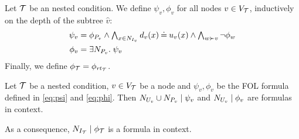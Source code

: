 Let ${\mathcal{T}}$ be an {\proper} nested condition. We define $\psi_v,\phi_v$ for all nodes $v\in V_{\mathcal{T}}$, inductively on the depth of the subtree $\hat v$:
%
\begin{align}
\psi_v = {} & \textstyle \phi_{P_v}\wedge \bigwedge_{x\in N_{I_v}} d_v(x)\Eq u_v(x) \wedge \bigwedge_{w\childof v} \neg\phi_w \label{eq:psi} \\
\phi_v = {} & \exists N_{P_v}\st \psi_v\label{eq:phi} 
\end{align}
%
Finally, we define $\phi_{\mathcal{T}}=\phi_{\mathit{rt}_{{\mathcal{T}}}}$.
%


\begin{proposition}
	\label{prop:formula in context}
	Let ${\mathcal{T}}$ be a {\proper} nested condition, $v \in V_{\mathcal{T}}$ be a node and $\psi_v, \phi_v$ be the FOL formula defined in \eqref{eq:psi} and \eqref{eq:phi}. Then ${N_{U_v}\cup N_{P_v}} \mid {\psi_v}$ and ${N_{U_v}} \mid {\phi_v}$ are formulas in context. 
 
	As a consequence, 	 ${N_{I_{\mathcal{T}}}} \mid {\phi_{\mathcal{T}}}$ is a formula in context. 
\end{proposition}
